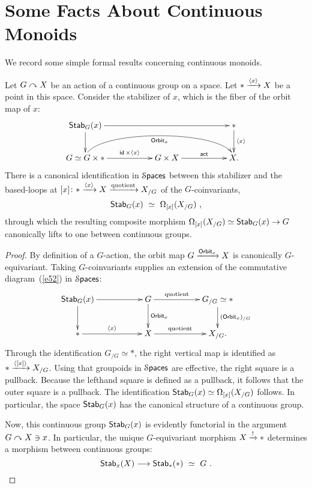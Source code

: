\chapter{Some Facts About Continuous Monoids} \label{sec.A}
We record some simple formal results concerning continuous monoids.

\begin{lemma}\label{t2}
Let $G \curvearrowright X$ be an action of a continuous group on a space.
Let $\ast \xrightarrow{\langle x \rangle } X$ be a point in this space.
Consider the stabilizer of $x$, which is the fiber of the orbit map of $x$:
\begin{equation}
\label{e52}
\xymatrix{
{\sf Stab}_G(x)
\ar[rrrr]
\ar[d]
&&
&&
\ast
\ar[d]^-{\lag x \rag}
\\
G \simeq G\times \ast 
\ar[rr]^-{ \id \times \lag x \rag} 
\ar@(u,u)[rrrr]_-{{\sf Orbit}_x}
&&
G \times X 
\ar[rr]^-{\sf act} 
&&
X
.
}
\end{equation}
There is a canonical identification in $\operatorname{\mathcal S\mathsf{paces}}$ between this stabilizer and the based-loops at $[x]\colon \ast \xrightarrow{\langle x \rangle} X \xrightarrow{\rm quotient} X_{/G}$ of the $G$-coinvariants,
\[
{\sf Stab}_G(x)
~\simeq~
\Omega_{[x]} ( X_{/G} )
~,
\]
through which the resulting composite morphism $\Omega_{[x]} ( X_{/G} )
\simeq {\sf Stab}_G(x)
\to 
G
$
canonically lifts to one between continuous groups.

\end{lemma}



\begin{proof}
By definition of a $G$-action, the orbit map $G\xrightarrow{{\sf Orbit}_x} X$ is canonically $G$-equivariant.
Taking $G$-coinvariants supplies an extension of the commutative diagram~(\ref{e52}) in $\operatorname{\mathcal S\mathsf{paces}}$:
\[
\xymatrix{
{\sf Stab}_G(x) 
\ar[rr] \ar[d]
&&
G 
\ar[d]^-{{\sf Orbit}_x} \ar[rr]^-{\rm quotient}
&&
G_{/G} 
\simeq 
\ast
\ar[d]^-{({\sf Orbit}_x)_{/G}}
\\
\ast \ar[rr]^-{\lag x\rag}
&&
X
\ar[rr]^-{\rm quotient}
&&
X_{/G}
.
}
\]
Through the identification $G_{/G} \simeq \ast$, the right vertical map is identified as $\ast\xrightarrow{\langle [x] \rangle} X_{/G}$.
Using that groupoids in $\operatorname{\mathcal S\mathsf{paces}}$ are effective, the right square is a pullback.  
Because the lefthand square is defined as a pullback, it follows that the outer square is a pullback.
The identification ${\sf Stab}_G(x) \simeq \Omega_{[x]} ( X_{/G} ) $ follows.  
In particular, the space ${\sf Stab}_G(x)$ has the canonical structure of a continuous group.


Now, this continuous group ${\sf Stab}_G(x)$ is evidently functorial in the argument $G \curvearrowright X \ni x$.  
In particular, the unique $G$-equivariant morphism $X\xrightarrow{!} \ast$ determines a morphism between continuous groups:
\[
{\sf Stab}_x(X)
\longrightarrow
{\sf Stab}_{\ast}(\ast)
~\simeq~
G
~.
\]


\end{proof}



